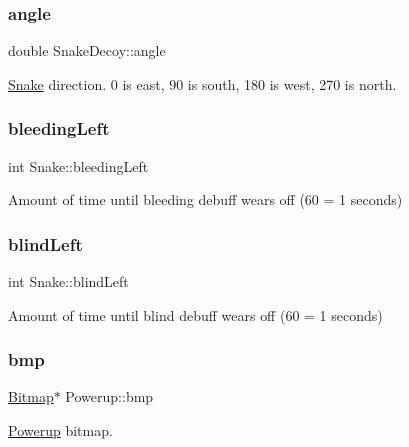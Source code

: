 \subsubsection{\texorpdfstring{angle}{angle}\hspace{0.1cm}{\footnotesize\ttfamily [2/2]}}
{\footnotesize\ttfamily double Snake\+Decoy\+::angle}



\mbox{\hyperlink{struct_snake}{Snake}} direction. 0 is east, 90 is south, 180 is west, 270 is north. 

\mbox{\label{group__snake_ga7b1c76ccd41a023734f3fe689279bace}} 
\subsubsection{\texorpdfstring{bleeding\+Left}{bleedingLeft}}
{\footnotesize\ttfamily int Snake\+::bleeding\+Left}



Amount of time until bleeding debuff wears off (60 = 1 seconds) 

\mbox{\label{group__snake_gadc0bae4f8aea84e975419c3186008be3}} 
\subsubsection{\texorpdfstring{blind\+Left}{blindLeft}}
{\footnotesize\ttfamily int Snake\+::blind\+Left}



Amount of time until blind debuff wears off (60 = 1 seconds) 

\mbox{\label{group__snake_ga13efa83c1c0242d50ed4a18a6cdc77af}} 
\subsubsection{\texorpdfstring{bmp}{bmp}\hspace{0.1cm}{\footnotesize\ttfamily [1/2]}}
{\footnotesize\ttfamily \mbox{\hyperlink{struct_bitmap}{Bitmap}}$\ast$ Powerup\+::bmp}



\mbox{\hyperlink{struct_powerup}{Powerup}} bitmap. 

